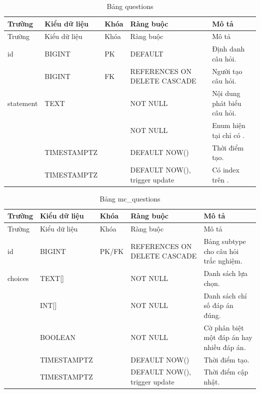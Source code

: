 \documentclass[12pt,a4paper]{report}
\begin{document}
\begin{longtable}{L{2.35cm} L{2.1cm} L{1.15cm} L{3.25cm} L{4.85cm}}
\caption{Bảng questions}\label{tab:db-questions}\\
\toprule
Trường & Kiểu dữ liệu & Khóa & Ràng buộc & Mô tả \\
\midrule
\endfirsthead\toprule Trường & Kiểu dữ liệu & Khóa & Ràng buộc & Mô tả \\\midrule\endhead
id & BIGINT & PK & DEFAULT  & Định danh câu hỏi. \\
 & BIGINT & FK & REFERENCES  ON DELETE CASCADE & Người tạo câu hỏi. \\
statement & TEXT & & NOT NULL & Nội dung phát biểu câu hỏi. \\
 &  & & NOT NULL & Enum hiện tại chỉ có . \\
 & TIMESTAMPTZ & & DEFAULT NOW() & Thời điểm tạo. \\
 & TIMESTAMPTZ & & DEFAULT NOW(), trigger update & Có index trên . \\

\bottomrule
\end{longtable}

\begin{longtable}{L{2.35cm} L{2.1cm} L{1.15cm} L{3.25cm} L{4.85cm}}
\caption{Bảng mc\_questions}\label{tab:db-mc-questions}\\
\toprule
Trường & Kiểu dữ liệu & Khóa & Ràng buộc & Mô tả \\
\midrule
\endfirsthead\toprule Trường & Kiểu dữ liệu & Khóa & Ràng buộc & Mô tả \\\midrule\endhead
id & BIGINT & PK/FK & REFERENCES  ON DELETE CASCADE & Bảng subtype cho câu hỏi trắc nghiệm. \\
choices & TEXT[] & & NOT NULL & Danh sách lựa chọn. \\
 & INT[] & & NOT NULL & Danh sách chỉ số đáp án đúng. \\
 & BOOLEAN & & NOT NULL & Cờ phân biệt một đáp án hay nhiều đáp án. \\
 & TIMESTAMPTZ & & DEFAULT NOW() & Thời điểm tạo. \\
 & TIMESTAMPTZ & & DEFAULT NOW(), trigger update & Thời điểm cập nhật. \\

\bottomrule
\end{longtable}
\end{document}
